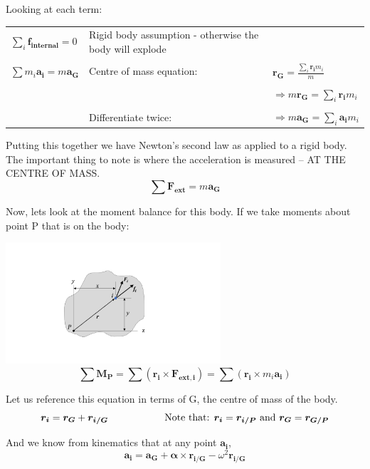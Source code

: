 \documentclass[12pt,letterpaper,twoside]{report}
\begin{document}
Looking at each term:
\begin{center}
\begin{tabu} to 1\textwidth {   X[-2.5, c] X[1, l]  X[1, l] }
$\sum_i \bm{f_{internal}} = 0$ & Rigid body assumption - otherwise the body will explode \\
& & \\
$\sum m_i \bm{a_i} = m \bm{a_G} $ & Centre of mass equation: & $\displaystyle  \bm{r_G} = \frac{\displaystyle  \sum_{i} \bm{r_i}  m_i}{\displaystyle m}$\\
& &\\
& & $\displaystyle \Rightarrow m \bm{r_G} =  \sum_{i} \bm{r_i}  m_i$\\
& &\\
& Differentiate twice: & $\displaystyle \Rightarrow m \bm{a_G} =  \sum_{i} \bm{a_i}  m_i$\\
\end{tabu}
\end{center}

Putting this together we have Newton’s second law as applied to a rigid body.  The important thing to note is where the acceleration is measured – AT THE CENTRE OF MASS.
\[ \displaystyle \sum \bm{F_{ext}} = m \bm{a_G} \]

Now, lets look at the moment balance for this body. If we take moments about point P that is on the body:

\includegraphics[trim={5cm 3cm 5cm 3cm},clip,width=0.6\textwidth, center]{Slide50} 
\[
\sum \bm{M_P} = \sum (\bm{r_i} \times \bm{F_{ext, i}}) = \sum (\bm{r_i} \times m_i \bm{a_i})
\]

Let us reference this equation in terms of G, the centre of mass of the body.
\[
\bm{r_i} = \bm{r_G} + \bm{r_{i/G}} \hspace{2 cm} \text{Note that: } \bm{r_i} =\bm{r_{i/P}} \text{ and } \bm{r_G} =\bm{r_{G/P}}
\]

\vspace*{3\baselineskip}

And we know from kinematics that at any point $\bm{a_i}$, 
\[
\bm{a_i} = \bm{a_G} + \bm{\alpha} \times \bm{r_{i/G}} - \omega^2 \bm{r_{i/G}}
\]
\end{document}
